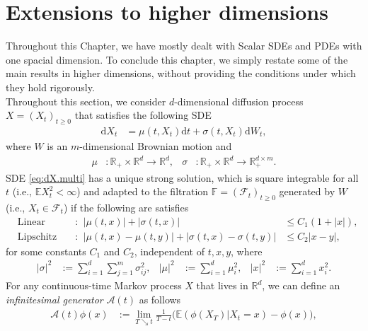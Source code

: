 \documentclass[12pt]{book}
\let\varphi\phi
\numberwithin{equation}{chapter}
\theoremstyle{plain}
\numberwithin{theorem}{section}
\theoremstyle{definition}
\numberwithin{exercise}{chapter}
\newcommand{\<}{\langle}
\renewcommand{\>}{\rangle}
\renewcommand{\(}{\left(}
\renewcommand{\)}{\right)}
\renewcommand{\[}{\left[}
\renewcommand{\]}{\right]}
\newcommand\Eb{\mathds{E}}
\newcommand\Fb{\mathds{F}}
\newcommand\Rb{\mathds{R}}
\newcommand\Ac{\mathscr{A}}
\newcommand\Fc{\mathscr{F}}
\newcommand\Pc{\mathscr{P}}
\newcommand\sig{\sigma}
\newcommand\Gam{\Gamma}
\newcommand\dd{\mathrm{d}}
\begin{document}
\section{Extensions to higher dimensions}
\label{sec:sde-d}
Throughout this Chapter, we have mostly dealt with Scalar SDEs and PDEs with one spacial dimension.  To conclude this chapter, we simply restate some of the main results in higher dimensions, without providing the conditions under which they hold rigorously.
\\[0.5em]
Throughout this section, we consider $d$-dimensional diffusion process $X = (X_t)_{t \geq 0}$ that satisfies the following SDE
\begin{align}
\dd X_t
	&=	\mu(t,X_t) \dd t + \sig(t,X_t) \dd W_t , \label{eq:dX.multi}
\end{align}
where $W$ is an $m$-dimensional Brownian motion and
\begin{align}
\mu 
	&: \Rb_+ \times \Rb^d \to \Rb^d , &
\sig
	&: \Rb_+ \times \Rb^d \to \Rb_+^{d \times m} .
\end{align}
SDE \eqref{eq:dX.multi} has a unique strong solution, which is square integrable for all $t$ (i.e., $\Eb X_t^2 < \infty$) and adapted to the filtration $\Fb=(\Fc_t)_{t \geq 0}$ generated by $W$ (i.e., $X_t \in \Fc_t$) if the following are satisfies
\begin{align}
&\text{Linear Growth}:&
| \mu(t,x) | + | \sig(t,x) |
	&\leq C_1 (1 + |x| ) , \label{eq:lin.growth} \\
&\text{Lipschitz Continuous}:&
| \mu(t,x) - \mu(t,y) | + | \sig(t,x)-\sig(t,y) |
	&\leq C_2  |x - y| , \label{eq:lipschitz.continuous}
\end{align}
for some constants $C_1$ and $C_2$, independent of $t,x,y$, where
\begin{align}
|\sig|^2
	&:= \sum_{i=1}^d \sum_{j=1}^m \sig_{ij}^2 , &
|\mu|^2
	&:=	\sum_{i=1}^d \mu_i^2 , &
|x|^2
	&:=	\sum_{i=1}^d x_i^2 .
\end{align}
For any continuous-time Markov process $X$ that lives in $\Rb^d$, we can define an \textit{infinitesimal generator} $\Ac(t)$ as follows
\begin{align}
\Ac(t) \varphi(x)
	&:= \lim_{T \searrow t} \frac{1}{T-t} \Big( \Eb ( \varphi(X_T) | X_t = x ) - \varphi(x) \Big) ,
\end{align}
\end{document}
